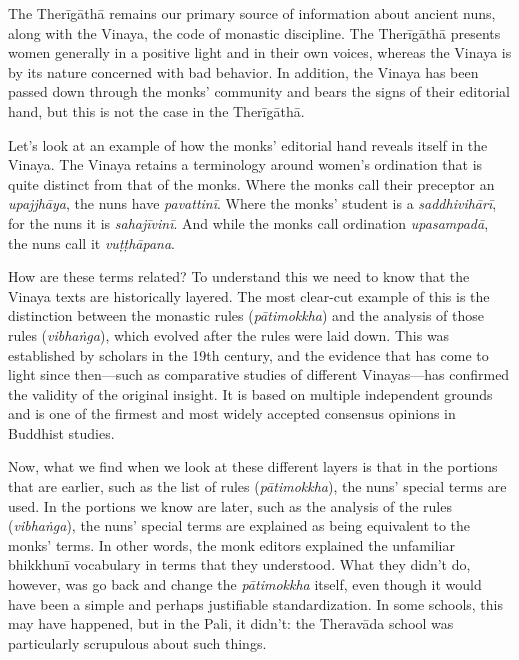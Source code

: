 \documentclass[12pt,openany]{book}%
\begin{document}
The \textsanskrit{Therīgāthā} remains our primary source of information about ancient nuns, along with the Vinaya, the code of monastic discipline. The \textsanskrit{Therīgāthā} presents women generally in a positive light and in their own voices, whereas the Vinaya is by its nature concerned with bad behavior. In addition, the Vinaya has been passed down through the monks’ community and bears the signs of their editorial hand, but this is not the case in the \textsanskrit{Therīgāthā}.

Let’s look at an example of how the monks’ editorial hand reveals itself in the Vinaya. The Vinaya retains a terminology around women’s ordination that is quite distinct from that of the monks. Where the monks call their preceptor an \textit{\textsanskrit{upajjhāya}}, the nuns have \textit{\textsanskrit{pavattinī}}. Where the monks’ student is a \textit{\textsanskrit{saddhivihārī}}, for the nuns it is \textit{\textsanskrit{sahajīvinī}}. And while the monks call ordination \textit{\textsanskrit{upasampadā}}, the nuns call it \textit{\textsanskrit{vuṭṭhāpana}}.

How are these terms related? To understand this we need to know that the Vinaya texts are historically layered. The most clear-cut example of this is the distinction between the monastic rules (\textit{\textsanskrit{pātimokkha}}) and the analysis of those rules (\textit{\textsanskrit{vibhaṅga}}), which evolved after the rules were laid down. This was established by scholars in the 19th century, and the evidence that has come to light since then—such as comparative studies of different Vinayas—has confirmed the validity of the original insight. It is based on multiple independent grounds and is one of the firmest and most widely accepted consensus opinions in Buddhist studies.

Now, what we find when we look at these different layers is that in the portions that are earlier, such as the list of rules (\textit{\textsanskrit{pātimokkha}}), the nuns’ special terms are used. In the portions we know are later, such as the analysis of the rules (\textit{\textsanskrit{vibhaṅga}}), the nuns’ special terms are explained as being equivalent to the monks’ terms. In other words, the monk editors explained the unfamiliar \textsanskrit{bhikkhunī} vocabulary in terms that they understood. What they didn’t do, however, was go back and change the \textit{\textsanskrit{pātimokkha}} itself, even though it would have been a simple and perhaps justifiable standardization. In some schools, this may have happened, but in the Pali, it didn’t: the \textsanskrit{Theravāda} school was particularly scrupulous about such things.
\end{document}
